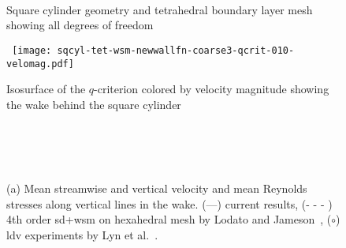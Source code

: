 \begin{figure}[h] \tt
\centering
{}
\caption{Square cylinder geometry and tetrahedral boundary layer mesh showing all degrees of freedom}
\label{sqcylmesh}
\end{figure}

\begin{figure}[h] \tt
\centering
\texttt{[image: sqcyl-tet-wsm-newwallfn-coarse3-qcrit-010-velomag.pdf]}
\caption{Isosurface of the $q$-criterion colored by velocity magnitude showing the wake behind the square cylinder}
\label{sqcylqcrit}
\end{figure}

\begin{figure}[h]
\centering
{}\\
\\
\\
\caption{\small (a) Mean streamwise and vertical velocity and mean Reynolds stresses along vertical lines in the wake.
(---) current results, (- - - ) 4th order \gls{sd}+\gls{wsm} on hexahedral mesh by Lodato and Jameson~\cite{lodato2012b}, ($\circ$) \gls{ldv} experiments by Lyn et al.~\cite{lyn1994,lyn1995}.}
\label{sqcylplots}
\end{figure}

